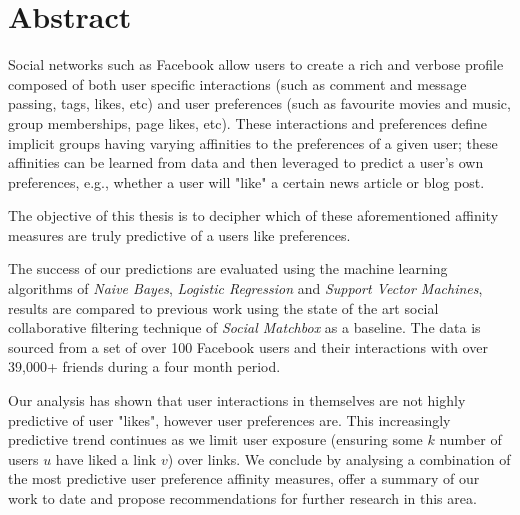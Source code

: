 
\chapter*{Abstract}
\label{cha:abstract}

Social networks such as Facebook allow users to create a rich and verbose profile composed of both user specific interactions (such as 
comment and message passing, tags, likes, etc) and user preferences (such as favourite movies and music, group memberships, page likes, etc). 
These interactions and preferences define implicit groups having varying affinities to the preferences of a given user; 
these affinities can be learned from data and then leveraged to predict a user's own preferences, e.g., 
whether a user will "like" a certain news article or blog post.

The objective of this thesis is to decipher which of these aforementioned affinity measures are truly predictive of a users like preferences.

The success of our predictions are evaluated using the machine learning algorithms of  
\emph{Naive Bayes}, \emph{Logistic Regression} and \emph{Support Vector Machines}, results are compared to previous 
work using the state of the art social collaborative filtering technique of \emph{Social Matchbox} as a baseline. 
The data is sourced from a set of over 100 Facebook users and their interactions with over 39,000+ friends during a four month period.

Our analysis has shown that user interactions in themselves are not highly predictive of user "likes", however user preferences are. 
This increasingly predictive trend continues as we limit user exposure (ensuring some $k$ number of users $u$ have liked a link $v$) over links. 
We conclude by analysing a combination of the most predictive user preference affinity measures, offer a summary of our work to date and propose 
recommendations for further research in this area.


